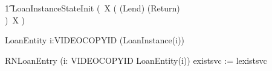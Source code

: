 \documentclass{article}
\begin{document}
\begin{circusaction}
   \t1 \circspot \lschexpract LoanInstanceStateInit \rschexpract \circseq  (\circmu\ X \circspot (
   					(Lend)
					\extchoice
					(Return)\\
					)\
					\circseq X )
\end{circusaction}

\begin{circus}
\circend
\end{circus}

\begin{circus}
    \circprocess LoanEntity \circdef  i:VIDEOCOPYID \circspot (LoanInstance(i))  \\

\end{circus}


\begin{circus}
  \circprocess RNLoanEntry \circdef (i: VIDEOCOPYID \circspot LoanEntity(i)) 
        \lcircrename existsvc := lexistsvc \rcircrename
\end{circus}
\end{document}

